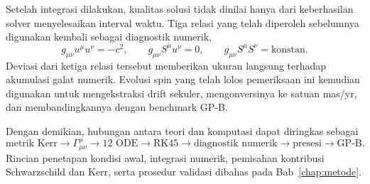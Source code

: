Setelah integrasi dilakukan, kualitas solusi tidak dinilai hanya dari
keberhasilan solver menyelesaikan interval waktu. Tiga relasi yang telah
diperoleh sebelumnya digunakan kembali sebagai diagnostik numerik,
\begin{equation}
    g_{\mu\nu}u^\mu u^\nu=-c^2,
    \qquad
    g_{\mu\nu}S^\mu u^\nu=0,
    \qquad
    g_{\mu\nu}S^\mu S^\nu=\text{konstan}.
    \label{eq:numerical-diagnostics}
\end{equation}
Deviasi dari ketiga relasi tersebut memberikan ukuran langsung terhadap
akumulasi galat numerik. Evolusi spin yang telah lolos pemeriksaan ini
kemudian digunakan untuk mengekstraksi drift sekuler, mengonversinya ke
satuan mas/yr, dan membandingkannya dengan benchmark GP-B.

Dengan demikian, hubungan antara teori dan komputasi dapat diringkas
sebagai
\begin{equation}
    \text{metrik Kerr}
    \longrightarrow
    \Gamma^\rho_{\mu\nu}
    \longrightarrow
    \text{12 ODE}
    \longrightarrow
    \text{RK45}
    \longrightarrow
    \text{diagnostik numerik}
    \longrightarrow
    \text{presesi}
    \longrightarrow
    \text{GP-B}.
    \label{eq:computational-validation-chain}
\end{equation}
Rincian penetapan kondisi awal, integrasi numerik, pemisahan kontribusi
Schwarzschild dan Kerr, serta prosedur validasi dibahas pada
Bab~\ref{chap:metode}.